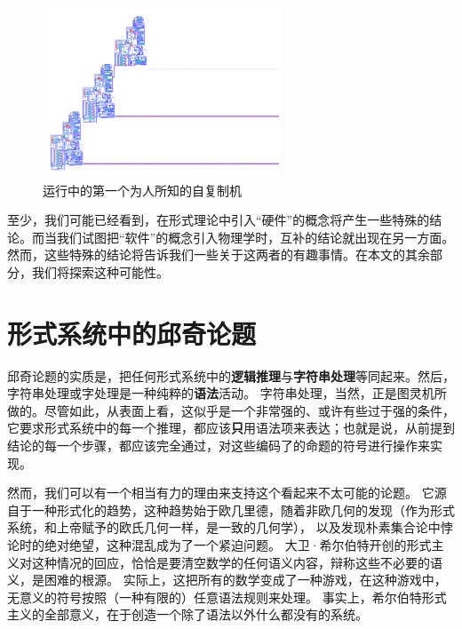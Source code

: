 \documentclass[a4paper,12pt]{article}
\begin{document}
\begin{figure}[ht]
\centering
\includegraphics[height=2.0in]{images/self_reprod.png}
\caption{运行中的第一个为人所知的自复制机}
\end{figure}

至少，我们可能已经看到，在\gls{形式理论}中引入“\gls{硬件}”的概念将产生一些特殊的结论。而当我们试图把“\gls{软件}”的概念引入物理学时，互补的结论就出现在另一方面。
然而，这些特殊的结论将告诉我们一些关于这两者的有趣事情。在本文的其余部分，我们将探索这种可能性。

\section{形式系统中的邱奇论题}

\gls{邱奇论题}的实质是，把任何\gls{形式系统}中的\textbf{\gls{逻辑推理}}与\textbf{\gls{字符串处理}}等同起来。然后，\gls{字符串处理}或字处理是一种纯粹的\textbf{\gls{语法}}活动。
\gls{字符串处理}，当然，正是\gls{图灵机}所做的。尽管如此，从表面上看，这似乎是一个非常强的、或许有些过于强的条件，
它要求\gls{形式系统}中的每一个\gls{推理}，都应该\textbf{只}用\gls{语法项}来表达；也就是说，从前提到结论的每一个步骤，都应该完全通过，对这些\gls{编码}了的命题的符号进行操作来实现。

然而，我们可以有一个相当有力的理由来支持这个看起来不太可能的论题。
它源自于一种\gls{形式化}的趋势，这种趋势始于欧几里德，随着非欧几何的发现（作为\gls{形式系统}，和上帝赋予的欧氏几何一样，是一致的几何学），
以及发现朴素集合论中悖论时的绝对绝望，这种混乱成为了一个紧迫问题。
大卫·希尔伯特开创的\gls{形式主义}对这种情况的回应，恰恰是要清空数学的任何\gls{语义内容}，辩称这些不必要的\gls{语义}，是困难的根源。
实际上，这把所有的数学变成了一种游戏，在这种游戏中，无意义的符号按照（一种有限的）任意\gls{语法规则}来处理。
事实上，希尔伯特\gls{形式主义}的全部意义，在于创造一个除了\gls{语法}以外什么都没有的系统。
\end{document}
